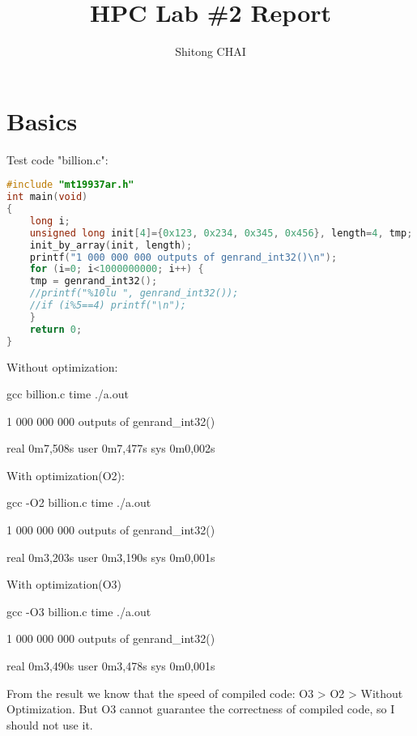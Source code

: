 \documentclass[a4paper, 12pt]{report}
\title{HPC Lab \#2 Report}
\date{}
\author{Shitong CHAI}
\begin{document}
\maketitle
\tableofcontents

\chapter {Basics}
Test code "billion.c":
\begin{lstlisting}[language=C]
#include "mt19937ar.h"
int main(void)
{
    long i;
    unsigned long init[4]={0x123, 0x234, 0x345, 0x456}, length=4, tmp;
    init_by_array(init, length);
    printf("1 000 000 000 outputs of genrand_int32()\n");
    for (i=0; i<1000000000; i++) {
    tmp = genrand_int32();
    //printf("%10lu ", genrand_int32());
    //if (i%5==4) printf("\n");
    }
    return 0;
}
\end{lstlisting}
Without optimization:
\begin{commandshell}
    gcc billion.c
    time ./a.out
\end{commandshell}
\begin{messageshell}
1 000 000 000 outputs of genrand_int32()

real    0m7,508s
user    0m7,477s
sys 0m0,002s
\end{messageshell}

With optimization(O2):
\begin{commandshell}
    gcc -O2 billion.c
    time ./a.out
\end{commandshell}
\begin{messageshell}
1 000 000 000 outputs of genrand_int32()

real    0m3,203s
user    0m3,190s
sys 0m0,001s
\end{messageshell}
With optimization(O3)
\begin{commandshell}
    gcc -O3 billion.c
    time ./a.out
\end{commandshell}
\begin{messageshell}
1 000 000 000 outputs of genrand_int32()

real    0m3,490s
user    0m3,478s
sys 0m0,001s
\end{messageshell}

From the result we know that the speed of compiled code: O3 > O2 > Without Optimization. But O3 cannot guarantee the correctness of compiled code, so I should not use it.
\end{document}
